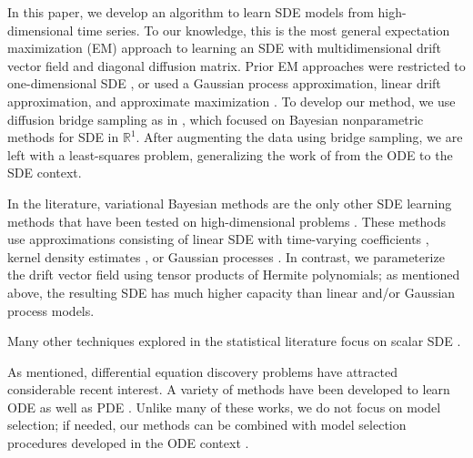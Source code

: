 \documentclass{article}
\begin{document}
In this paper, we develop an algorithm to learn SDE models from high-dimensional time series.  To our knowledge, this is the most general expectation maximization (EM) approach to learning an SDE with multidimensional drift vector field and diagonal diffusion matrix.  Prior EM approaches were restricted to one-dimensional SDE \cite{ghahramani_learning_1999}, or used a Gaussian process approximation, linear drift approximation, and approximate maximization \cite{ruttor_approximate_2013}.  To develop our method, we use diffusion bridge sampling as in \cite{van_der_meulen_reversible_2014, meulen_adaptive_2017}, which focused on Bayesian nonparametric methods for SDE in $\mathbb{R}^1$.  After augmenting the data using bridge sampling, we are left with a least-squares problem, generalizing the work of \cite{brunton_discovering_2016} from the ODE to the SDE context.

In the literature, variational Bayesian methods are the only other SDE learning methods that have been tested on high-dimensional problems \cite{vrettas_variational_2015}.  These methods use approximations consisting of linear SDE with time-varying coefficients \cite{archambeau_variational_2008}, kernel density estimates \cite{batz_variational_2016}, or Gaussian processes \cite{batz_approximate_2017}.  In contrast, we parameterize the drift vector field using tensor products of Hermite polynomials; as mentioned above, the resulting SDE has much higher capacity than linear and/or Gaussian process models.

Many other techniques explored in the statistical literature focus on scalar SDE \cite{nicolau_nonparametric_2007, muller_empirical_2010, verzelen_inferring_2012, bhat_nonparametric_2016}.

As mentioned, differential equation discovery problems have attracted considerable recent interest.  A variety of methods have been developed to learn ODE \cite{brunton_discovering_2016, schon_probabilistic_2017, chen_network_2017, tran_exact_2017, schaeffer_extracting_2017, schaeffer_learning_2017, quade_sparse_2018} as well as PDE \cite{schaeffer_sparse_2013, raissi_machine_2017, rudy_data-driven_2017, raissi_hidden_2018}.  Unlike many of these works, we do not focus on model selection; if needed, our methods can be combined with model selection procedures developed in the ODE context \cite{mangan_inferring_2016, mangan_model_2017}.
\end{document}
